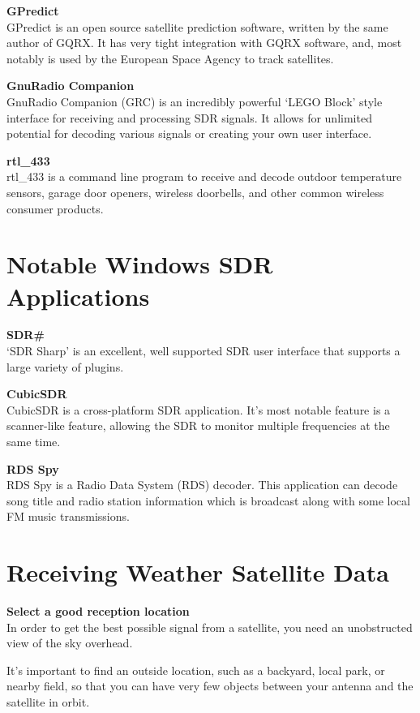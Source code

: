 \documentclass[10pt,foldmark,notumble]{leaflet}
\begin{document}
\textbf{GPredict}\\
GPredict is an open source satellite prediction software, written by the same
author of GQRX\@. It has very tight integration with GQRX software, and, most
notably is used by the European Space Agency to track satellites.

\textbf{GnuRadio Companion}\\
GnuRadio Companion (GRC) is an incredibly powerful `LEGO Block' style interface
for receiving and processing SDR signals. It allows for unlimited potential
for decoding various signals or creating your own user interface.

\textbf{rtl\_433}\\
rtl\_433 is a command line program to receive and decode outdoor temperature
sensors, garage door openers, wireless doorbells, and other common wireless
consumer products.

\section{Notable Windows SDR Applications\color{red}\hrulefill\color{black}}
\textbf{SDR\#}\\
`SDR Sharp' is an excellent, well supported SDR user interface that supports
a large variety of plugins.

\textbf{CubicSDR}\\
CubicSDR is a cross-platform SDR application. It's most notable feature
is a scanner-like feature, allowing the SDR to monitor multiple frequencies
at the same time.

\textbf{RDS Spy}\\
RDS Spy is a Radio Data System (RDS) decoder.
This application can decode song title and radio station information which
is broadcast along with some local FM music transmissions.

\section{Receiving Weather Satellite Data\color{red}\hrulefill\color{black}}
\textbf{Select a good reception location}\\
In order to get the best possible signal from a satellite,
you need an unobstructed view of the sky overhead.

It's important to find an outside location, such as a backyard, local park, or
nearby field, so that you can have very few objects between your antenna and the
satellite in orbit.
\end{document}
